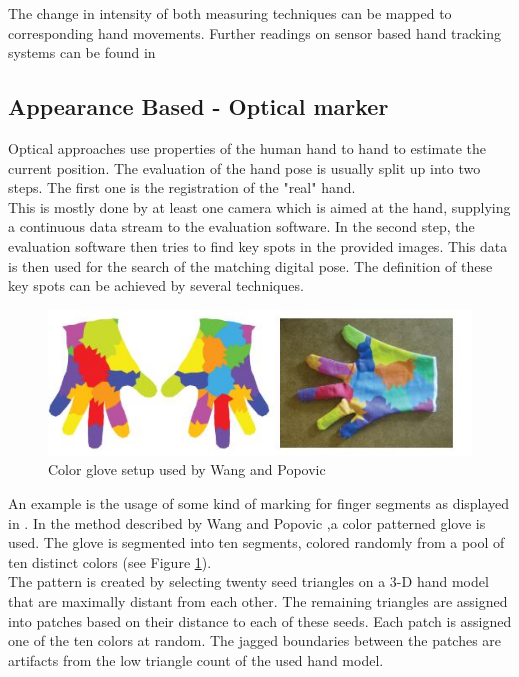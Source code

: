 The change in intensity of both measuring techniques can be mapped to corresponding hand movements.
Further readings on sensor based hand tracking systems can be found in \cite{Dipietro.2008,Sturman.1994}
\subsection{Appearance Based - Optical marker}
\label{Appearance Based Optical marker}
Optical approaches use properties of the human hand to hand to estimate the current position. The evaluation of the hand pose is usually split up into two steps. The first one is the registration of the "real" hand.\\
This is mostly done by at least one camera which is aimed at the hand, supplying a continuous data stream to the evaluation software. In the second step, the evaluation software then tries to find key spots in the provided images. This data is then used for the search of the matching digital pose. The definition of these key spots can be achieved by several techniques.\newpage
\begin{figure}
\includegraphics[width=\textwidth]{images/wang_color_glove.JPG}
\caption{Color glove setup used by Wang and Popovic \cite{Wang.2009} }
\label{wang color glove}
\end{figure}
An example is the usage of some kind of marking for finger segments as displayed in \cite{Duca.2007,Fredriksson.2008,Wang.2009}.
In the method described by Wang and Popovic \cite{Wang.2009},a color patterned glove is used. The glove is segmented into ten segments, colored randomly from a pool of ten distinct colors (see Figure \ref{wang color glove}).\\
The pattern is created by selecting twenty seed triangles on a 3-D hand model that are maximally distant from each other. The remaining triangles are assigned into patches based on their distance to each of these seeds. Each patch is assigned one of the ten colors at random. The jagged boundaries between the patches are artifacts from the low triangle count of the used hand model.
